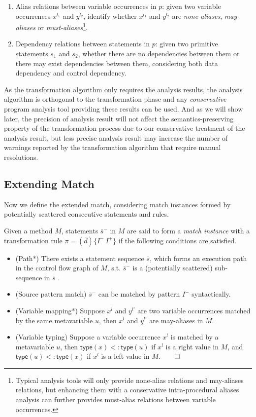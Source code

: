 \documentclass[letterpaper, USenglish]{lipics-v2016}
\theoremstyle{plain}
\begin{document}
\begin{enumerate}\itemsep0pt
\item Alias relations between variable occurrences in $p$: given two variable occurrences $x^{l_1}$ and $y^{l_2}$, identify whether $x^{l_1}$ and $y^{l_2}$ are \textit{none-aliases}, \textit{may-aliases} or \textit{must-aliases}\footnote{Typical analysis tools will only provide none-alias relations and may-aliases relations, but enhancing them with a conservative intra-procedural aliases analysis can further provides must-alias relations between variable occurrences.}.
\item Dependency relations between statements in $p$: given two primitive statements $s_1$ and $s_2$, whether there are no dependencies between them or there may exist dependencies between them, considering both data dependency and control dependency.
\end{enumerate}
As the transformation algorithm only requires the analysis results, the analysis algorithm is orthogonal to the transformation phase and any \textit{conservative} program analysis tool providing these results can be used. And as we will show later, the precision of analysis result will not affect the semantics-preserving property of the transformation process due to our conservative treatment of the analysis result, but less precise analysis result may increase the number of warnings reported by the transformation algorithm that require manual resolutions.

\subsection{Extending Match}

Now we define the extended match, considering match instances formed by potentially scattered consecutive statements and rules.

\begin{definition}[Match*]
\label{def:match*}
Given a method $M$, statements $\bar{s}^{-}$ in $M$ are said to form a \emph{match instance} with a transformation rule $\pi=(\bar{d})\{I^{-}~I^+\}$ if the following conditions are satisfied.
\begin{itemize}
\item (Path*) There exists a statement sequence $\bar{s}$, which forms
  an execution path in the control flow graph of $M$, s.t.
  $\bar{s}^{-}$ is a (potentially scattered) sub-sequence in $\bar{s}$ .
\item (Source pattern match) $\bar{s}^{-}$ can be matched by pattern $I^{-}$ syntactically.
\item (Variable mapping*) Suppose $x^l$ and $y^{l'}$ are two variable
  occurrences matched by the same metavariable $u$, then $x^l$ and
  $y^{l'}$ are may-aliases in $M$.
\item (Variable typing) Suppose a variable occurrence $x^l$ is matched by a metavariable $u$, then $\mathsf{type}(x)<:\mathsf{type}(u)$ if $x^l$ is a right value in $M$, and $\mathsf{type}(u)<:\mathsf{type}(x)$ if $x^l$ is a left value in $M$.\hfill $\qed$ 
\end{itemize}
\end{definition}
\end{document}
